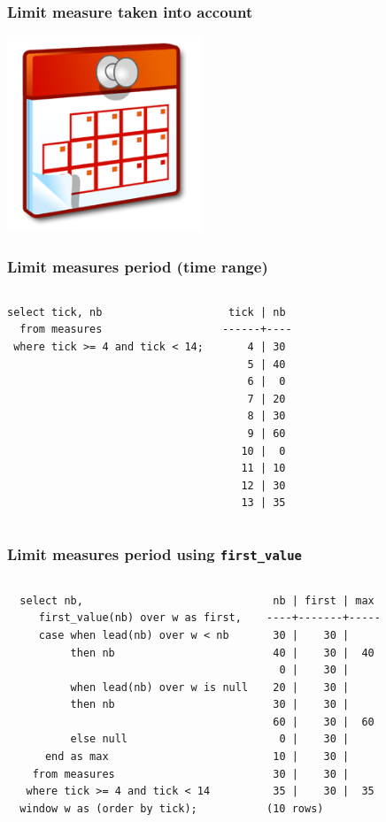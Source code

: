 \documentclass{beamer}
\begin{document}
\begin{frame}[fragile]
  \frametitle{Limit measure taken into account}

  \begin{center}
    \includegraphics[height=2.3in]{calendar.png}
  \end{center}
\end{frame}

\begin{frame}[fragile]
  \frametitle{Limit measures period (time range)}

\begin{columns}
\begin{verbatim}
select tick, nb
  from measures
 where tick >= 4 and tick < 14;
\end{verbatim}

\begin{verbatim}
 tick | nb 
------+----
    4 | 30
    5 | 40
    6 |  0
    7 | 20
    8 | 30
    9 | 60
   10 |  0
   11 | 10
   12 | 30
   13 | 35
\end{verbatim}
\end{columns}
\end{frame}

\begin{frame}[fragile]
  \frametitle{Limit measures period using \texttt{first\_value}}

\begin{columns}
\begin{verbatim}
  select nb,
     first_value(nb) over w as first,
     case when lead(nb) over w < nb
          then nb

          when lead(nb) over w is null
          then nb

          else null
      end as max
    from measures
   where tick >= 4 and tick < 14
  window w as (order by tick);
\end{verbatim}

\begin{verbatim}
 nb | first | max 
----+-------+-----
 30 |    30 |    
 40 |    30 |  40
  0 |    30 |    
 20 |    30 |    
 30 |    30 |    
 60 |    30 |  60
  0 |    30 |    
 10 |    30 |    
 30 |    30 |    
 35 |    30 |  35
(10 rows)
\end{verbatim}
\end{columns}
\end{frame}
\end{document}
